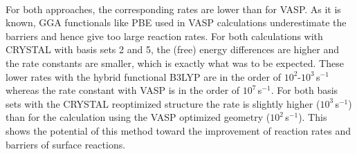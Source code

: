 \documentclass[11pt,DIV=13,BCOR=5mm,a4paper,headinclude]{scrbook}
\begin{document}
\\
For both approaches, the corresponding rates are lower than for VASP. As it is known, GGA functionals like PBE used in VASP calculations underestimate the barriers\cite{Zhao05} and hence give too large reaction rates.
For both calculations with CRYSTAL with basis sets 2 and 5, the (free) energy differences are higher and the rate constants are smaller, which is exactly what was to be expected.
These lower rates with the hybrid functional B3LYP are in the order of $10^2$-$10^3\,$s$^{-1}$ whereas the rate constant with VASP is in the order of $10^7\,$s$^{-1}$. 
For both basis sets with the CRYSTAL reoptimized structure the rate is slightly higher ($10^3\,$s$^{-1}$) than for the calculation using the VASP optimized geometry ($10^2\,$s$^{-1}$).
This shows the potential of this method toward the improvement of reaction rates and barriers of surface reactions.
\end{document}
